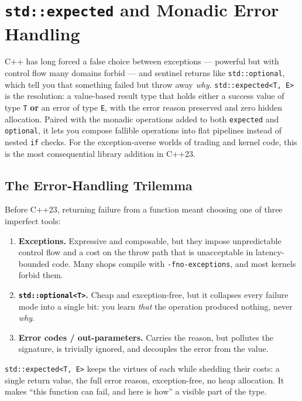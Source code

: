 \chapter{\texttt{std::expected} and Monadic Error Handling}
\label{ch:expected-monadic}

C++ has long forced a false choice between exceptions --- powerful but with control flow many domains forbid --- and sentinel returns like \lstinline|std::optional|, which tell you that something failed but throw away \emph{why}. \lstinline|std::expected<T, E>| is the resolution: a value-based result type that holds either a success value of type \lstinline|T| \textbf{or} an error of type \lstinline|E|, with the error reason preserved and zero hidden allocation. Paired with the monadic operations added to both \lstinline|expected| and \lstinline|optional|, it lets you compose fallible operations into flat pipelines instead of nested \lstinline|if| checks. For the exception-averse worlds of trading and kernel code, this is the most consequential library addition in C++23.

\section{The Error-Handling Trilemma}

Before C++23, returning failure from a function meant choosing one of three imperfect tools:

\begin{enumerate}
    \item \textbf{Exceptions.} Expressive and composable, but they impose unpredictable control flow and a cost on the throw path that is unacceptable in latency-bounded code. Many shops compile with \lstinline|-fno-exceptions|, and most kernels forbid them.
    \item \textbf{\lstinline|std::optional<T>|.} Cheap and exception-free, but it collapses every failure mode into a single bit: you learn \emph{that} the operation produced nothing, never \emph{why}.
    \item \textbf{Error codes / out-parameters.} Carries the reason, but pollutes the signature, is trivially ignored, and decouples the error from the value.
\end{enumerate}

\lstinline|std::expected<T, E>| keeps the virtues of each while shedding their costs: a single return value, the full error reason, exception-free, no heap allocation. It makes ``this function can fail, and here is how'' a visible part of the type.

